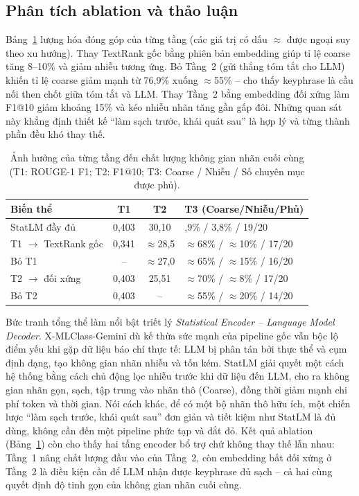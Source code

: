 \subsection{Phân tích ablation và thảo luận}
Bảng~\ref{tab:ablation} lượng hóa đóng góp của từng tầng (các giá trị có dấu
$\approx$ được ngoại suy theo xu hướng). Thay TextRank gốc bằng phiên bản embedding
giúp tỉ lệ coarse tăng 8--10\% và giảm nhiễu tương ứng. Bỏ Tầng~2 (gửi thẳng tóm
tắt cho LLM) khiến tỉ lệ coarse giảm mạnh từ 76,9\% xuống $\approx$55\% -- cho
thấy keyphrase là cầu nối then chốt giữa tóm tắt và LLM. Thay Tầng~2 bằng embedding
đối xứng làm F1@10 giảm khoảng 15\% và kéo nhiễu nhãn tăng gần gấp đôi. Những quan
sát này khẳng định thiết kế ``làm sạch trước, khái quát sau'' là hợp lý và từng
thành phần đều khó thay thế.

\begin{table}[!t]
\renewcommand{\arraystretch}{1.25}
\caption{Ảnh hưởng của từng tầng đến chất lượng không gian nhãn cuối cùng
(T1: ROUGE-1 F1; T2: F1@10; T3: Coarse / Nhiễu / Số chuyên mục được phủ).}
\label{tab:ablation}
\centering
\footnotesize
\begin{tabularx}{\columnwidth}{@{}Xcc>{\raggedright\arraybackslash}X@{}}
\toprule
\textbf{Biến thể} & \textbf{T1} & \textbf{T2} & \textbf{T3 (Coarse/Nhiễu/Phủ)} \\
\midrule
StatLM đầy đủ          & 0,403 & 30,10 & 76,9\% / 3,8\% / 19/20 \\
T1 $\to$ TextRank gốc  & 0,341 & $\approx$28,5 & $\approx$68\% / $\approx$10\% / 17/20 \\
Bỏ T1                  & --    & $\approx$27,0 & $\approx$65\% / $\approx$15\% / 16/20 \\
T2 $\to$ đối xứng       & 0,403 & 25,51 & $\approx$70\% / $\approx$8\% / 17/20 \\
Bỏ T2                  & 0,403 & --    & $\approx$55\% / $\approx$20\% / 14/20 \\
\bottomrule
\end{tabularx}
\end{table}

Bức tranh tổng thể làm nổi bật triết lý \emph{Statistical Encoder -- Language
Model Decoder}. X-MLClass-Gemini dù kế thừa sức mạnh của pipeline gốc vẫn bộc lộ điểm yếu khi
gặp dữ liệu báo chí thực tế: LLM bị phân tán bởi thực thể và cụm định dạng, tạo
không gian nhãn nhiễu và tốn kém. StatLM giải quyết một cách hệ thống bằng cách
chủ động lọc nhiễu trước khi dữ liệu đến LLM, cho ra không gian nhãn gọn, sạch,
tập trung vào nhãn thô (Coarse), đồng thời giảm mạnh chi phí token và thời gian.
Nói cách khác, để có một bộ nhãn thô hữu ích, một chiến lược ``làm sạch trước,
khái quát sau'' đơn giản và tiết kiệm như StatLM là đủ dùng, không cần đến một
pipeline phức tạp và đắt đỏ. Kết quả ablation (Bảng~\ref{tab:ablation}) còn cho
thấy hai tầng encoder bổ trợ chứ không thay thế lẫn nhau: Tầng~1 nâng chất lượng
đầu vào của Tầng~2, còn embedding bất đối xứng ở Tầng~2 là điều kiện cần để LLM
nhận được keyphrase đủ sạch -- cả hai cùng quyết định độ tinh gọn của không gian
nhãn cuối cùng.

